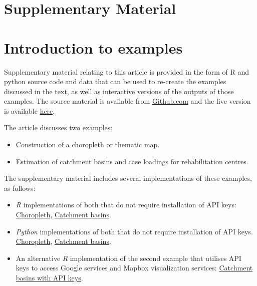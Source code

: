 \documentclass[utf8]{frontiers_suppmat} %
\begin{document}
\onecolumn
{}

\title[Supplementary Material]{{}}


\maketitle


\section{Supplementary Material}


\section{Introduction to examples}

Supplementary material relating to this article is provided in the
form of R and python source code and data that can be used to re-create the
examples discussed in the text, as well as interactive versions of the
outputs of those examples. The source material is available from \href{https://github.com/richardbeare/GeospatialStroke}{Github.com} and the live version is available
\href{https://richardbeare.github.io/GeospatialStroke/index.html}{here}.


The article discusses two examples: 
\begin{itemize}
\item Construction of a choropleth or thematic map.
\item Estimation of catchment basins and case loadings for rehabilitation centres.
\end{itemize}

The supplementary material includes several implementations of these examples, as follows:

\begin{itemize}
\item {\em R} implementations of both that do not require installation of API keys: \href{https://richardbeare.github.io/GeospatialStroke/Choropleth/mmc_surrounds.html}{Choropleth}, \href{https://richardbeare.github.io/GeospatialStroke/RehabCatchment/README.html}{Catchment basins}.
\item {\em Python} implementations of both that do not require installation of API keys. \href{https://richardbeare.github.io/GeospatialStroke/python/notebooks/example1.html}{Choropleth}, \href{https://richardbeare.github.io/GeospatialStroke/python/notebooks/example2.html}{Catchment basins}.
\item An alternative {\em R} implementation of the second example that utilises API keys to access Google services and Mapbox visualization services: \href{https://richardbeare.github.io/GeospatialStroke/RehabCatchmentAdvances/Googleway_Mapdeck.html}{Catchment basins with API keys}.
\end{itemize}
\end{document}
